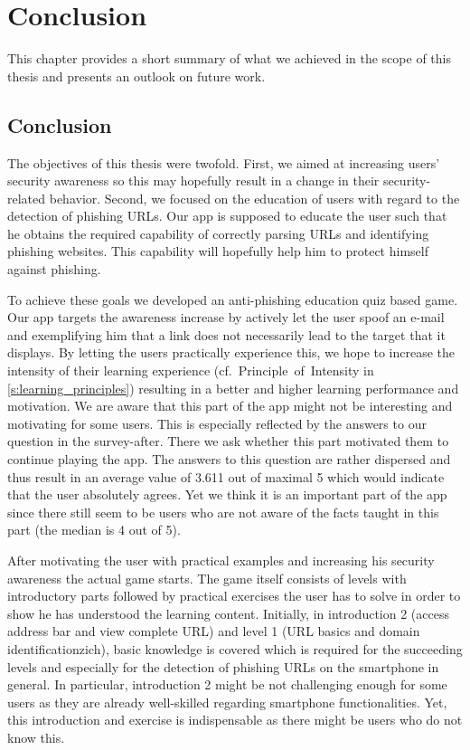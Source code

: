 
\section{Conclusion}
\label{s:conclusion}

This chapter provides a short summary of what we achieved in the scope of this thesis and presents an outlook on future work.

\subsection{Conclusion}
The objectives of this thesis were twofold.
First, we aimed at increasing users' security awareness so this may hopefully result in a change in their security-related behavior.
Second, we focused on the education of users with regard to the detection of phishing URLs. 
Our app is supposed to educate the user such that he obtains the required capability of correctly parsing URLs and identifying phishing websites.
This capability will hopefully help him to protect himself against phishing.

To achieve these goals we developed an anti-phishing education quiz based game.
Our app targets the awareness increase by actively let the user spoof an e-mail and exemplifying him that a link does not necessarily lead to the target that it displays.
By letting the users practically experience this, we hope to increase the intensity of their learning experience (cf.~Principle~of~Intensity in \autoref{s:learning_principles}) resulting in a better and higher learning performance and motivation. We are aware that this part of the app might not be interesting and motivating for some users.
This is especially reflected by the answers to our question in the survey-after.
There we ask whether this part motivated them to continue playing the app. 
The answers to this question are rather dispersed and thus result in an average value of 3.611 out of maximal 5 which would indicate that the user absolutely agrees.
Yet we think it is an important part of the app since there still seem to be users who are not aware of the facts taught in this part (the median is 4 out of 5).

After motivating the user with practical examples and increasing his security awareness the actual game starts.
The game itself consists of levels with introductory parts followed by practical exercises the user has to solve in order to show he has understood the learning content.
Initially, in introduction 2 (access address bar and view complete URL) and level 1 (URL basics and domain identificationzich), basic knowledge is covered which is required for the succeeding levels and especially for the detection of phishing URLs on the smartphone in general.
In particular, introduction 2 might be not challenging enough for some users as they are already well-skilled regarding smartphone functionalities.
Yet, this introduction and exercise is indispensable as there might be users who do not know this.

